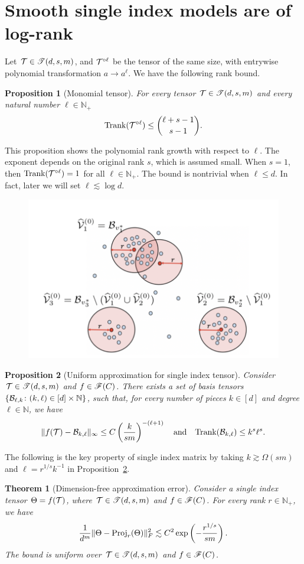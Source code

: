 \documentclass[11pt]{article}
\theoremstyle{plain}
\newtheorem{thm}{Theorem}[section]
\newtheorem{prop}{Proposition}
\theoremstyle{definition}
\def\rank{\textup{Trank}}
\def\calif{\large\mathscr{F}}
\def\caliT{\large\mathscr{T}}
\begin{document}
\section{Smooth single index models are of log-rank}
Let $\tT\in \caliT(d,s,m)$, and $\mathcal{T}^{\circ \ell}$ be the tensor of the same size, with entrywise polynomial transformation $a\to a^\ell$. We have the following rank bound.
\begin{prop}[Monomial tensor] For every tensor $\tT\in\caliT(d,s,m)$ and every natural number $\ell\in\mathbb{N}_{+}$
\[
\rank(\tT^{\circ \ell})\leq {\ell+s-1 \choose s-1}.
\]
\end{prop}
This proposition shows the polynomial rank growth with respect to $\ell$. The exponent depends on the original rank $s$, which is assumed small. When $s=1$, then $\rank(\tT^{\circ \ell})=1$ for all $\ell\in\mathbb{N}_{+}$. The bound is nontrivial when $\ell \leq d$. In fact, later we will set $\ell \lesssim \log d$. 

\begin{figure}
\centering
\includegraphics[width=.5\textwidth]{illustrate.png}
\end{figure}

\begin{prop}[Uniform approximation for single index tensor]\label{prop:approximation} Consider $\tT\in\caliT(d,s,m)$ and $f\in\calif(C)$.  There exists a set of basis tensors $\{\mathcal{B}_{\ell,k}\colon (k,\ell)\in[d]\times\mathbb{N}\}$, such that, for every number of pieces $k\in[d]$ and degree $\ell\in\mathbb{N}$, we have
\[
\mnormSize{}{f(\tT)-\tB_{k,\ell}}\leq C\left( {k\over sm}\right)^{-(\ell+1)} \quad \text{and}\quad \rank(\tB_{k,\ell})\leq k^{s}\ell^s.
\]
\end{prop}


The following is the key property of single index matrix by taking $k\gtrsim \Omega(sm)$ and $\ell=r^{1/s}k^{-1}$ in Proposition~\ref{prop:approximation}.
\begin{thm}[Dimension-free approximation error]\label{thm:approximation} Consider a single index tensor $\Theta=f(\mathcal{T})$, where $\tT\in \caliT(d,s,m)$ and $f\in\calif(C)$. For every rank $r\in\mathbb{N}_{+}$,  we have
\[
{1\over d^m}\lVert\Theta-\textup{Proj}_r(\Theta)\rVert_F^2 \lesssim C^2\exp\left(-{r^{1/s}\over sm}\right).
\]
The bound is uniform over $\tT\in\caliT(d,s,m)$ and $f\in\calif(C)$. 
\end{thm}
\end{document}
